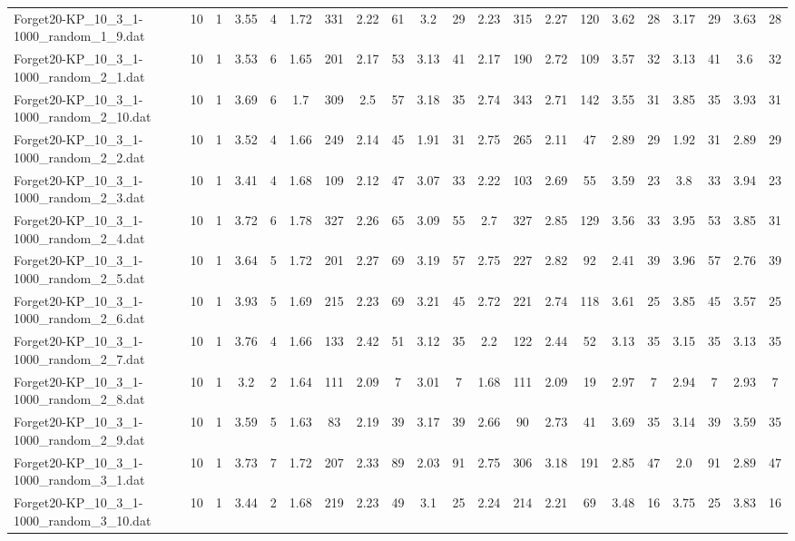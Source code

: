 \begin{sidewaystable}[!ht]
{\begin{tabular}{lcccccccccccccccccccc}
Forget20-KP\_10\_3\_1-1000\_random\_1\_9.dat & 10 & 1 & 3.55 & 4 & 1.72 & 331 & 2.22 & 61 & 3.2 & 29 & 2.23 & 315 & 2.27 & 120 & 3.62 & 28 & 3.17 & 29 & 3.63 & 28 \\
Forget20-KP\_10\_3\_1-1000\_random\_2\_1.dat & 10 & 1 & 3.53 & 6 & 1.65 & 201 & 2.17 & 53 & 3.13 & 41 & 2.17 & 190 & 2.72 & 109 & 3.57 & 32 & 3.13 & 41 & 3.6 & 32 \\
Forget20-KP\_10\_3\_1-1000\_random\_2\_10.dat & 10 & 1 & 3.69 & 6 & 1.7 & 309 & 2.5 & 57 & 3.18 & 35 & 2.74 & 343 & 2.71 & 142 & 3.55 & 31 & 3.85 & 35 & 3.93 & 31 \\
Forget20-KP\_10\_3\_1-1000\_random\_2\_2.dat & 10 & 1 & 3.52 & 4 & 1.66 & 249 & 2.14 & 45 & 1.91 & 31 & 2.75 & 265 & 2.11 & 47 & 2.89 & 29 & 1.92 & 31 & 2.89 & 29 \\
Forget20-KP\_10\_3\_1-1000\_random\_2\_3.dat & 10 & 1 & 3.41 & 4 & 1.68 & 109 & 2.12 & 47 & 3.07 & 33 & 2.22 & 103 & 2.69 & 55 & 3.59 & 23 & 3.8 & 33 & 3.94 & 23 \\
Forget20-KP\_10\_3\_1-1000\_random\_2\_4.dat & 10 & 1 & 3.72 & 6 & 1.78 & 327 & 2.26 & 65 & 3.09 & 55 & 2.7 & 327 & 2.85 & 129 & 3.56 & 33 & 3.95 & 53 & 3.85 & 31 \\
Forget20-KP\_10\_3\_1-1000\_random\_2\_5.dat & 10 & 1 & 3.64 & 5 & 1.72 & 201 & 2.27 & 69 & 3.19 & 57 & 2.75 & 227 & 2.82 & 92 & 2.41 & 39 & 3.96 & 57 & 2.76 & 39 \\
Forget20-KP\_10\_3\_1-1000\_random\_2\_6.dat & 10 & 1 & 3.93 & 5 & 1.69 & 215 & 2.23 & 69 & 3.21 & 45 & 2.72 & 221 & 2.74 & 118 & 3.61 & 25 & 3.85 & 45 & 3.57 & 25 \\
Forget20-KP\_10\_3\_1-1000\_random\_2\_7.dat & 10 & 1 & 3.76 & 4 & 1.66 & 133 & 2.42 & 51 & 3.12 & 35 & 2.2 & 122 & 2.44 & 52 & 3.13 & 35 & 3.15 & 35 & 3.13 & 35 \\
Forget20-KP\_10\_3\_1-1000\_random\_2\_8.dat & 10 & 1 & 3.2 & 2 & 1.64 & 111 & 2.09 & 7 & 3.01 & 7 & 1.68 & 111 & 2.09 & 19 & 2.97 & 7 & 2.94 & 7 & 2.93 & 7 \\
Forget20-KP\_10\_3\_1-1000\_random\_2\_9.dat & 10 & 1 & 3.59 & 5 & 1.63 & 83 & 2.19 & 39 & 3.17 & 39 & 2.66 & 90 & 2.73 & 41 & 3.69 & 35 & 3.14 & 39 & 3.59 & 35 \\
Forget20-KP\_10\_3\_1-1000\_random\_3\_1.dat & 10 & 1 & 3.73 & 7 & 1.72 & 207 & 2.33 & 89 & 2.03 & 91 & 2.75 & 306 & 3.18 & 191 & 2.85 & 47 & 2.0 & 91 & 2.89 & 47 \\
Forget20-KP\_10\_3\_1-1000\_random\_3\_10.dat & 10 & 1 & 3.44 & 2 & 1.68 & 219 & 2.23 & 49 & 3.1 & 25 & 2.24 & 214 & 2.21 & 69 & 3.48 & 16 & 3.75 & 25 & 3.83 & 16 \\

\end{tabular}}
\end{sidewaystable}
